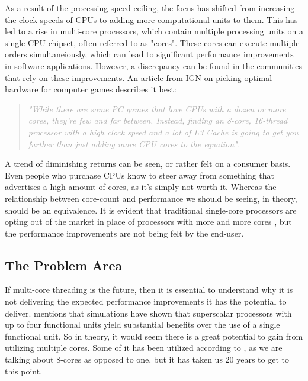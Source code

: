 \documentclass[12pt,a4paper]{article}
\begin{document}
As a result of the processing speed ceiling, the focus has shifted from increasing the clock speeds of CPUs to adding more computational units to them. This has led to a rise in multi-core processors, which contain multiple processing units on a single CPU chipset, often referred to as "cores". These cores can execute multiple orders simultaneiously, which can lead to significant performance improvements in software applications. However, a discrepancy can be found in the communities that rely on these improvements. An article from IGN \parencite{Thomas2025} on picking optimal hardware for computer games describes it best:

\begin{quote}
    \textit{\textcolor{darkgray}{"While there are some PC games that love CPUs with a dozen or more cores, they’re few and far between. 
    Instead, finding an 8-core, 16-thread processor with a high clock speed and a lot of L3 Cache is going to get you further than just adding more CPU cores to the equation". }}
\end{quote}

A trend of diminishing returns can be seen, or rather felt on a consumer basis. Even people who purchase CPUs know to steer away from something that advertises a high amount of cores, as it's simply not worth it. Whereas the relationship between core-count and performance we should be seeing, in theory, should be an equivalence. It is evident that traditional single-core processors are opting out of the market in place of processors with more and more cores \parencite{Smith2023}, but the performance improvements are not being felt by the end-user.

\subsection{The Problem Area}

If multi-core threading is the future, then it is essential to understand why it is not delivering the expected performance improvements it has the potential to deliver. \cite[p. 12]{Rauber2023} mentions that simulations have shown that superscalar processors with up to four functional units yield substantial benefits over the use of a single functional unit. So in theory, it would seem there is a great potential to gain from utilizing multiple cores. Some of it has been utilized according to \textcite{Thomas2025}, as we are talking about 8-cores as opposed to one, but it has taken us 20 years to get to this point.
\end{document}
